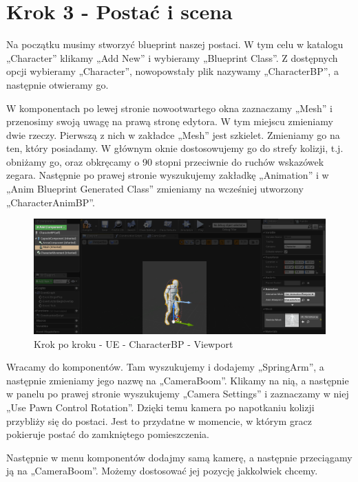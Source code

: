 \documentclass[12pt]{xmgr}
\begin{document}
\section{Krok 3 - Postać i scena}

Na początku musimy stworzyć blueprint naszej postaci. W tym celu w katalogu „Character” klikamy „Add New” i wybieramy „Blueprint Class”. Z dostępnych opcji wybieramy „Character”, nowopowstały plik nazywamy „CharacterBP”, a następnie otwieramy go.

W komponentach po lewej stronie nowootwartego okna zaznaczamy „Mesh” i przenosimy swoją uwagę na prawą stronę edytora. W tym miejscu zmieniamy dwie rzeczy. Pierwszą z nich w zakładce „Mesh” jest szkielet. Zmieniamy go na ten, który posiadamy. W głównym oknie dostosowujemy go do strefy kolizji, t.j. obniżamy go, oraz obkręcamy o 90 stopni przeciwnie do ruchów wskazówek zegara. Następnie po prawej stronie wyszukujemy zakładkę „Animation” i w „Anim Blueprint Generated Class” zmieniamy na wcześniej utworzony „CharacterAnimBP”.

\newpage
\begin{figure}[!htb]
    \begin{center}
    \includegraphics[scale=0.35]{Screeny/UeKrokPoKroku/UE-CharacterBP-Viewport.png}
    \end{center}
    \caption{Krok po kroku - UE -  CharacterBP - Viewport}
\end{figure}


Wracamy do komponentów. Tam wyszukujemy i dodajemy „SpringArm”, a następnie zmieniamy jego nazwę na „CameraBoom”. Klikamy na nią, a następnie w panelu po prawej stronie wyszukujemy „Camera Settings” i zaznaczamy w niej „Use Pawn Control Rotation”. Dzięki temu kamera po napotkaniu kolizji przybliży się do postaci. Jest to przydatne w momencie, w którym gracz pokieruje postać do zamkniętego pomieszczenia. 

Następnie w menu komponentów dodajmy samą kamerę, a następnie przeciągamy ją na „CameraBoom”. Możemy dostosować jej pozycję jakkolwiek chcemy.
\end{document}
